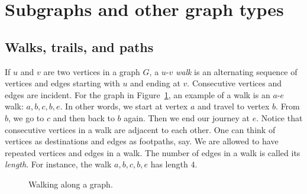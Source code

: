 
\section{Subgraphs and other graph types}
\label{sec:introduction:subgraphs_graph_types}



\subsection{Walks, trails, and paths}

If $u$ and $v$ are two vertices in a graph $G$, a $u$-$v$ \emph{walk}
is an alternating sequence of vertices and edges starting with $u$ and
ending at $v$. Consecutive vertices and edges are incident. For the
graph in Figure~\ref{fig:introduction:types_of_walks}, an example of a
walk is an $a$-$e$ walk: $a, b, c, b, e$. In other words, we
start at vertex $a$ and travel to vertex $b$. From $b$, we go to $c$
and then back to $b$ again. Then we end our journey at $e$. Notice
that consecutive vertices in a walk are adjacent to each other. One
can think of vertices as destinations and edges as footpaths, say. We
are allowed to have repeated vertices and edges in a walk. The number
of edges in a walk is called its \emph{length}. For instance, the
walk $a, b, c, b, e$ has length $4$.

\begin{figure}[!htbp]
\centering
{}
\caption{Walking along a graph.}
\label{fig:introduction:types_of_walks}
\end{figure}

